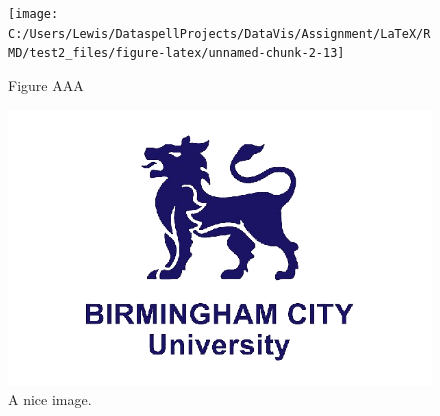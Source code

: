\begin{figure}[H]

{\centering \texttt{[image: C:/Users/Lewis/DataspellProjects/DataVis/Assignment/LaTeX/RMD/test2\_files/figure-latex/unnamed-chunk-2-13]} 

}

\caption{Figure AAA}\label{fig:unnamed-chunk-2-13}
\end{figure}
\begin{figure}
\includegraphics[width=0.5\linewidth]{../images/bcu logo} \caption{A nice image.}\label{fig:unnamed-chunk-3}
\end{figure}
